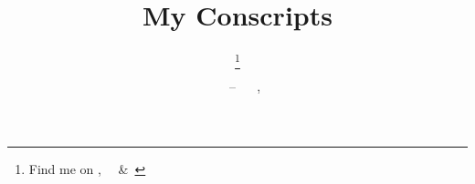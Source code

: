 \title{%
    My Conscripts
}
\author{\thanks{%
    Find me on
    ,~%
    ~\&~%
}}
\date{%
    ~%
    ~%
    --~%
    \DTMmonthname{\number\month}~%
    \number\day,~%
    \number\year%
}